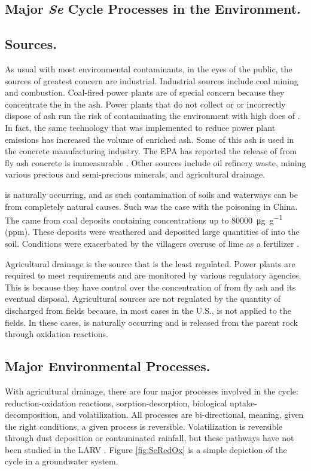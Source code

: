 \begin{linenumbers}[1]
\section{Major \textit{Se} Cycle Processes in the Environment.}
\label{sec:major processes}

\subsection*{\Se Sources.}
As usual with most environmental contaminants, in the eyes of the public, the sources of greatest concern are industrial.  Industrial sources include coal mining and combustion.  Coal-fired power plants are of special concern because they concentrate the \Se in the ash.  Power plants that do not collect or or incorrectly dispose of ash run the risk of contaminating the environment with high does of \Se \parencite{Lemly2002}.  In fact, the same technology that was implemented to reduce power plant emissions has increased the volume of \Se enriched ash.  Some of this ash is used in the concrete manufacturing industry.  The EPA has reported the release of \Se from fly ash concrete is immeasurable \parencite{EPA2014}.  Other sources include oil refinery waste, mining various precious and semi-precious minerals, and agricultural drainage.

\Se is naturally occurring, and as such contamination of soils and waterways can be from completely natural causes.  Such was the case with the \Se poisoning in China.  The \Se came from coal deposits containing \Se concentrations up to \SI{80000}{\micro\g\per\g} (ppm).  These deposits were weathered and deposited large quantities of \Se into the soil.   Conditions were exacerbated by the villagers overuse of lime as a fertilizer \parencite{yang1983}.

Agricultural drainage is the \Se source that is the least regulated.  Power plants are required to meet requirements and are monitored by various regulatory agencies.  This is because they have control over the concentration of \Se from fly ash and its eventual disposal.  Agricultural sources are not regulated by the quantity of \Se discharged from fields because, in most cases in the U.S., \Se is not applied to the fields.  In these cases, \Se is naturally occurring and is released from the parent rock through oxidation reactions.  

\subsection*{Major Environmental Processes.}
With agricultural drainage, there are four major processes involved in the \Se cycle: reduction-oxidation reactions, sorption-desorption, biological uptake-decomposition, and volatilization.  All processes are bi-directional, meaning, given the right conditions, a given process is reversible.  Volatilization is reversible through \Se dust deposition or \Se contaminated rainfall, but these pathways have not been studied in the LARV \parencite{Lawson2001}.  Figure \ref{fig:SeRedOx} is a simple depiction of the \Se cycle in a groundwater system.


\end{linenumbers}
